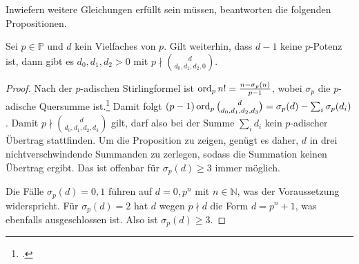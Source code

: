 Inwiefern weitere Gleichungen erfüllt sein müssen, beantworten die folgenden Propositionen.
\begin{prop}
Sei $p \in \mathbb P$ und $d$ kein Vielfaches von $p$. Gilt weiterhin, dass $d-1$ keine $p$-Potenz ist, dann gibt es $d_0, d_1, d_2 > 0$ mit $p \nmid \binom d{d_0,d_1,d_2,0}$.
\end{prop}
\begin{proof}
Nach der $p$-adischen Stirlingformel ist $\operatorname{ord}_p n! = \frac{n - \sigma_p(n)}{p-1}$, wobei $\sigma_p$ die $p$-adische Quersumme ist.\footcite[Kap.~2, §8, Lemma~1, S.~171]{LieGroups} Damit folgt $(p-1)\operatorname{ord}_p \binom d{d_0,d_1,d_2,d_3} = \sigma_p(d) - \sum_i \sigma_p(d_i)$. Damit $p \nmid \binom d{d_0,d_1,d_2,d_3}$ gilt, darf also bei der Summe $\sum_i d_i$ kein $p$-adischer Übertrag stattfinden. Um die Proposition zu zeigen, genügt es daher, $d$ in drei nichtverschwindende Summanden zu zerlegen, sodass die Summation keinen Übertrag ergibt. Das ist offenbar für $\sigma_p(d) \geq 3$ immer möglich.

Die Fälle $\sigma_p(d) = 0, 1$ führen auf $d = 0, p^n$ mit $n \in \mathbb N$, was der Voraussetzung widerspricht. Für $\sigma_p(d) = 2$ hat $d$ wegen $p \nmid d$ die Form $d=p^n+1$, was ebenfalls ausgeschlossen ist. Also ist $\sigma_p(d) \geq 3$.
\end{proof}

